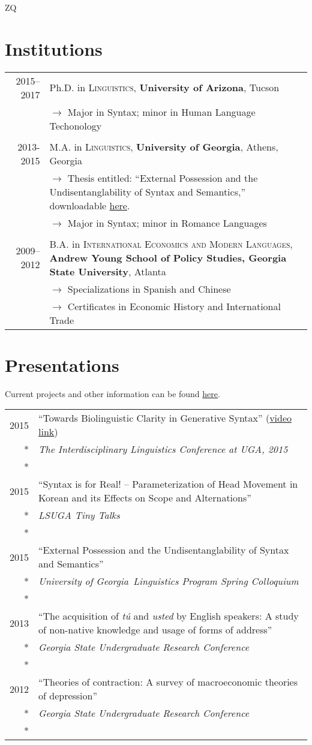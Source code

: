 ZQ\documentclass[letterpaper,10pt]{article}
\newcommand{\ent}[3]{{\textsc{#1}}&#2\\*&\textit{#3}\\*\multicolumn{2}{c}{}\\}
\newcommand{\uga}{University of Georgia}
\newcommand{\ua}{University of Arizona}
\begin{document}
\section{Institutions}
\begin{longtable}{r|p{12cm}}	
\textsc{2015--2017} & Ph.D. in \textsc{Linguistics}, \textbf{\ua}, Tucson\\
&$\rightarrow$ Major in Syntax; minor in Human Language Techonology\\
\multicolumn{2}{c}{} \\


\textsc{2013-2015}& M.A. in \textsc{Linguistics}, \textbf{\uga}, Athens, Georgia\\
&$\rightarrow$ Thesis entitled: ``External Possession and the Undisentanglability of Syntax and Semantics,'' downloadable \href{http://lukesmith.xyz/dox/luke\_thesis.pdf}{here}.\\
&$\rightarrow$ Major in Syntax; minor in Romance Languages\\

\multicolumn{2}{c}{} \\

\textsc{2009--2012}& B.A. in \textsc{International Economics and Modern Languages}, \textbf{Andrew Young School of Policy Studies, Georgia State University}, Atlanta\\
&$\rightarrow$ Specializations in Spanish and Chinese\\
&$\rightarrow$ Certificates in Economic History and International Trade\\
\end{longtable}

\section{Presentations}

Current projects and other information can be found \href{http://lukesmith.xyz/academic.php}{here}.
\begin{longtable}{r|p{12cm}}

\ent{2015}{``Towards Biolinguistic Clarity in Generative Syntax'' (\href{https://www.youtube.com/watch?v=yk03pXPGiVs}{video link})}{The Interdisciplinary Linguistics Conference at UGA, 2015}

\ent{2015}{``Syntax is for Real! -- Parameterization of Head Movement in Korean and its Effects on Scope and Alternations''}{LSUGA Tiny Talks}

\ent{2015}{``External Possession and the Undisentanglability of Syntax and Semantics''}{\uga\ Linguistics Program Spring Colloquium}

\ent{2013}{``The acquisition of \emph{t\'u} and \emph{usted} by English speakers: A study of non-native knowledge and usage of forms of address''}{Georgia State Undergraduate Research Conference}

\ent{2012}{``Theories of contraction: A survey of macroeconomic theories of depression''}{Georgia State Undergraduate Research Conference}

\end{longtable}
\end{document}

